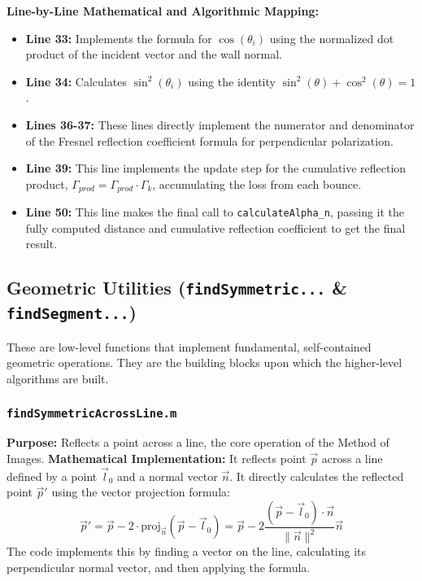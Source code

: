 \documentclass{article}
\begin{document}
	\textbf{Line-by-Line Mathematical and Algorithmic Mapping:}
	\begin{itemize}
		\item \textbf{Line 33:} Implements the formula for $\cos(\theta_i)$ using the normalized dot product of the incident vector and the wall normal.
		\item \textbf{Line 34:} Calculates $\sin^2(\theta_i)$ using the identity $\sin^2(\theta) + \cos^2(\theta) = 1$.
		\item \textbf{Lines 36-37:} These lines directly implement the numerator and denominator of the Fresnel reflection coefficient formula for perpendicular polarization.
		\item \textbf{Line 39:} This line implements the update step for the cumulative reflection product, $\Gamma_{prod} = \Gamma_{prod} \cdot \Gamma_k$, accumulating the loss from each bounce.
		\item \textbf{Line 50:} This line makes the final call to \texttt{calculateAlpha\_n}, passing it the fully computed distance and cumulative reflection coefficient to get the final result.
	\end{itemize}
	
	\subsection{Geometric Utilities (\texttt{findSymmetric...} \& \texttt{findSegment...})}
	These are low-level functions that implement fundamental, self-contained geometric operations. They are the building blocks upon which the higher-level algorithms are built.
	
	\subsubsection{\texttt{findSymmetricAcrossLine.m}}
	\textbf{Purpose:} Reflects a point across a line, the core operation of the Method of Images.
	\textbf{Mathematical Implementation:} It reflects point $\vec{p}$ across a line defined by a point $\vec{l}_0$ and a normal vector $\vec{n}$. It directly calculates the reflected point $\vec{p}'$ using the vector projection formula:
	\begin{equation}
		\vec{p}' = \vec{p} - 2 \cdot \text{proj}_{\vec{n}}(\vec{p} - \vec{l}_0) = \vec{p} - 2 \frac{(\vec{p} - \vec{l}_0) \cdot \vec{n}}{\|\vec{n}\|^2} \vec{n}
	\end{equation}
	The code implements this by finding a vector on the line, calculating its perpendicular normal vector, and then applying the formula.
	
\end{document}
